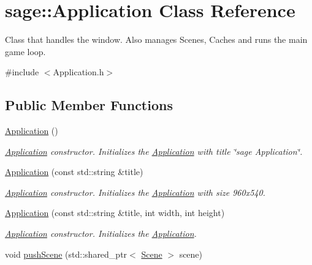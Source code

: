 \hypertarget{classsage_1_1Application}{}\section{sage\+::Application Class Reference}
\label{classsage_1_1Application}


Class that handles the window. Also manages Scenes, Caches and runs the main game loop.  




{\ttfamily \#include $<$Application.\+h$>$}

\subsection*{Public Member Functions}
\begin{DoxyCompactItemize}
\item 
\mbox{\hyperlink{classsage_1_1Application_afa8cc05ce6b6092be5ecdfdae44e05f8}{Application}} ()
\begin{DoxyCompactList}\small\item\em \mbox{\hyperlink{classsage_1_1Application}{Application}} constructor. Initializes the \mbox{\hyperlink{classsage_1_1Application}{Application}} with title \char`\"{}sage Application\char`\"{}. \end{DoxyCompactList}\item 
\mbox{\hyperlink{classsage_1_1Application_a357c8d817e692dae201b5b29148ad74d}{Application}} (const std\+::string \&title)
\begin{DoxyCompactList}\small\item\em \mbox{\hyperlink{classsage_1_1Application}{Application}} constructor. Initializes the \mbox{\hyperlink{classsage_1_1Application}{Application}} with size 960x540. \end{DoxyCompactList}\item 
\mbox{\hyperlink{classsage_1_1Application_ac7fce9bde96a86a6d26618a34cb09fa5}{Application}} (const std\+::string \&title, int width, int height)
\begin{DoxyCompactList}\small\item\em \mbox{\hyperlink{classsage_1_1Application}{Application}} constructor. Initializes the \mbox{\hyperlink{classsage_1_1Application}{Application}}. \end{DoxyCompactList}\item 
void \mbox{\hyperlink{classsage_1_1Application_aa4644a106875cb18286b08131cb807d2}{push\+Scene}} (std\+::shared\+\_\+ptr$<$ \mbox{\hyperlink{classsage_1_1Scene}{Scene}} $>$ scene)

\end{DoxyCompactItemize}
